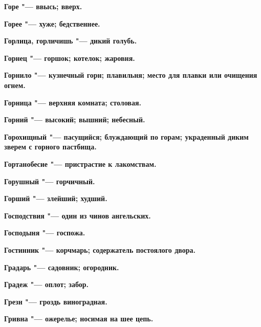 \bfseries Горе \normalfont{} "--- ввысь; вверх. 




\bfseries Горее \normalfont{} "--- хуже; бедственнее. 




\bfseries Горлица, горличишь \normalfont{} "--- дикий голубь. 




\bfseries Горнец \normalfont{} "--- горшок; котелок; жаровня. 




\bfseries Горнило \normalfont{} "--- кузнечный горн; плавильня; место для плавки или очищения огнем. 




\bfseries Горница \normalfont{} "--- верхняя комната; столовая. 




\bfseries Горний \normalfont{} "--- высокий; вышний; небесный. 




\bfseries Горохищный \normalfont{} "--- пасущийся; блуждающий по горам; украденный диким зверем с горного пастбища. 




\bfseries Гортанобесие \normalfont{} "--- пристрастие к лакомствам. 




\bfseries Горушный \normalfont{} "--- горчичный. 




\bfseries Горший \normalfont{} "--- злейший; худший. 




\bfseries Господствия \normalfont{} "--- один из чинов ангельских. 




\bfseries Господыня \normalfont{} "--- госпожа. 




\bfseries Гостинник \normalfont{} "--- корчмарь; содержатель постоялого двора. 




\bfseries Градарь \normalfont{} "--- садовник; огородник. 




\bfseries Градеж \normalfont{} "--- оплот; забор. 




\bfseries Грезн \normalfont{} "--- гроздь виноградная. 




\bfseries Гривна \normalfont{} "--- ожерелье; носимая на шее цепь. 




